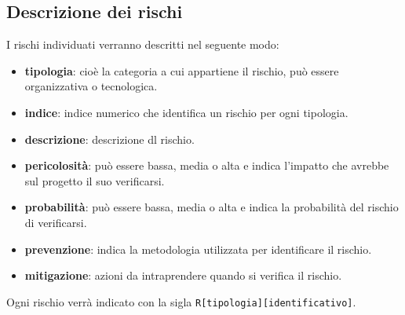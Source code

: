 \subsection{Descrizione dei rischi}
I rischi individuati verranno descritti nel seguente modo:
\begin{itemize}
    \item \textbf{tipologia}: cioè la categoria a cui appartiene il rischio, può essere organizzativa o tecnologica.
    \item \textbf{indice}: indice numerico che identifica un rischio per ogni tipologia.
    \item \textbf{descrizione}: descrizione dl rischio.
    \item \textbf{pericolosità}: può essere bassa, media o alta e indica l'impatto che avrebbe sul progetto il suo verificarsi.
    \item \textbf{probabilità}: può essere bassa, media o alta e indica la probabilità del rischio di verificarsi.
    \item \textbf{prevenzione}: indica la metodologia utilizzata per identificare il rischio.
    \item \textbf{mitigazione}: azioni da intraprendere quando si verifica il rischio.   
\end{itemize}
Ogni rischio verrà indicato con la sigla \texttt{R[tipologia][identificativo]}.